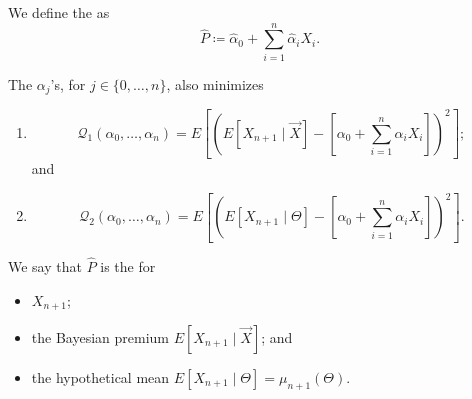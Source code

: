 \documentclass[notoc,notitlepage]{tufte-book}
\begin{document}
\begin{defn}\label{defn:estimator_for_the_credibility_premium}
  We define the  as
  \begin{equation*}
    \hat{P} \coloneqq \hat{\alpha}_0 + \sum_{i=1}^{n} \hat{\alpha}_i X_i.
  \end{equation*}
\end{defn}

\begin{crly}\label{crly:p_hat_as_best_linear_estimator}
  The $\alpha_j$'s, for $j \in \{0, \ldots, n\}$, also minimizes
  \begin{enumerate}
    \item 
      \begin{equation*}
        \mathcal{Q}_1(\alpha_0, \ldots, \alpha_n) = E \left[ \left( E[X_{n+1}
          \mid \vec{X}] - \left[\alpha_0 + \sum_{i=1}^{n} \alpha_i X_i\right]
          \right)^2 \right];
      \end{equation*}
      and
    \item 
      \begin{equation*}
        \mathcal{Q}_2(\alpha_0, \ldots, \alpha_n) = E \left[ \left( E[X_{n+1}
          \mid \Theta] - \left[ \alpha_0 + \sum_{i=1}^{n} \alpha_i X_i \right]
          \right)^2 \right].
      \end{equation*}
  \end{enumerate}

  We say that $\hat{P}$ is the  for
  \begin{itemize}
    \item $X_{n+1}$;
    \item the Bayesian premium $E[X_{n+1} \mid \vec{X}]$; and
    \item the hypothetical mean $E[X_{n+1} \mid \Theta] = \mu_{n+1}(\Theta)$.
  \end{itemize}
\end{crly}

\end{document}
